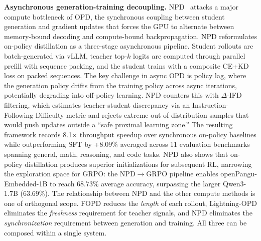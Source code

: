 \documentclass{article} %
\begin{document}
\textbf{Asynchronous generation-training decoupling.} NPD~\citep{rang2026npd} attacks a major compute bottleneck of OPD, the synchronous coupling between student generation and gradient updates that forces the GPU to alternate between memory-bound decoding and compute-bound backpropagation. NPD reformulates on-policy distillation as a three-stage asynchronous pipeline. Student rollouts are batch-generated via vLLM, teacher top-$k$ logits are computed through parallel prefill with sequence packing, and the student trains with a composite CE+KD loss on packed sequences. The key challenge in async OPD is policy lag, where the generation policy drifts from the training policy across async iterations, potentially degrading into off-policy learning. NPD counters this with $\Delta$-IFD filtering, which estimates teacher-student discrepancy via an Instruction-Following Difficulty metric and rejects extreme out-of-distribution samples that would push updates outside a ``safe proximal learning zone.'' The resulting framework records 8.1$\times$ throughput speedup over synchronous on-policy baselines while outperforming SFT by +8.09\% averaged across 11 evaluation benchmarks spanning general, math, reasoning, and code tasks. NPD also shows that on-policy distillation produces superior initializations for subsequent RL, narrowing the exploration space for GRPO: the NPD$\to$GRPO pipeline enables openPangu-Embedded-1B to reach 68.73\% average accuracy, surpassing the larger Qwen3-1.7B (63.69\%). The relationship between NPD and the other compute methods is one of orthogonal scope. FOPD reduces the \emph{length} of each rollout, Lightning-OPD eliminates the \emph{freshness} requirement for teacher signals, and NPD eliminates the \emph{synchronization} requirement between generation and training. All three can be composed within a single system.
\end{document}

